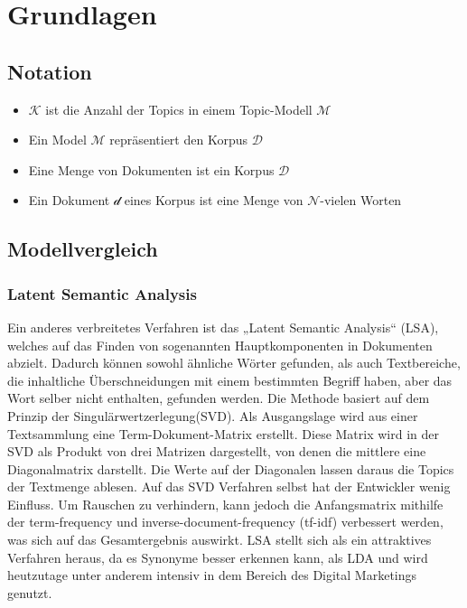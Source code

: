 \documentclass[german,version-2020-11]{uzl-thesis}
\begin{document}
\chapter{Grundlagen}%


\section{Notation}

\begin{itemize}
	\item $\mathcal{K}$ ist die Anzahl der Topics in einem Topic-Modell $\mathcal{M}$
	\item Ein Model $\mathcal{M}$ repräsentiert den Korpus $\mathcal{D}$
	\item Eine Menge von Dokumenten ist ein Korpus $\mathcal{D}$
	\item Ein Dokument $\mathcal{d}$ eines Korpus ist eine Menge von $\mathcal{N}$-vielen 
	Worten 
\end{itemize}


\section{Modellvergleich}

\subsection{Latent Semantic Analysis}
Ein anderes verbreitetes Verfahren ist das „Latent Semantic Analysis“ (LSA), welches auf das Finden von sogenannten Hauptkomponenten in Dokumenten abzielt. Dadurch können sowohl ähnliche Wörter gefunden, als auch Textbereiche, die inhaltliche Überschneidungen mit einem bestimmten Begriff haben, aber das Wort selber nicht enthalten, gefunden werden. Die Methode basiert auf dem Prinzip der Singulärwertzerlegung(SVD). Als Ausgangslage wird aus einer Textsammlung eine Term-Dokument-Matrix erstellt. Diese Matrix wird in der SVD als Produkt von drei Matrizen dargestellt, von denen die mittlere eine Diagonalmatrix darstellt. Die Werte auf der Diagonalen lassen daraus die Topics der Textmenge ablesen. Auf das SVD Verfahren selbst hat der Entwickler wenig Einfluss. Um Rauschen zu verhindern, kann jedoch die Anfangsmatrix mithilfe der term-frequency und inverse-document-frequency (tf-idf) verbessert werden, was sich auf das Gesamtergebnis auswirkt. LSA stellt sich als ein attraktives Verfahren heraus, da es Synonyme besser erkennen kann, als LDA und wird heutzutage unter anderem intensiv in dem Bereich des Digital Marketings genutzt.
\end{document}
